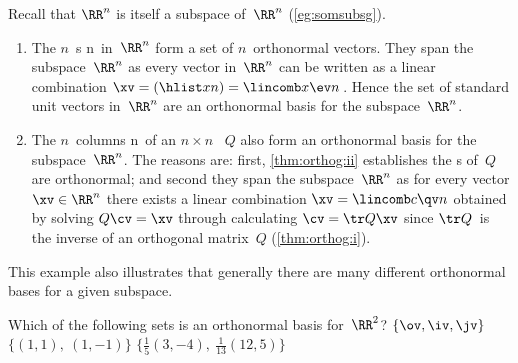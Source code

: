 \begin{example} 
Recall that \(\RR^n\) is itself a subspace of~\(\RR^n\) (\cref{eg:somsubsg}).
\begin{enumerate}
\item The \(n\)~s \hlist\ev n\ in~\(\RR^n\) form a set of \(n\)~orthonormal vectors.
They span the subspace~\(\RR^n\) as every vector in~\(\RR^n\) can be written as a linear combination \(\xv=(\hlist xn)=\lincomb x\ev n\)\,.
Hence the set of standard unit vectors in~\(\RR^n\) are an orthonormal basis for the subspace~\(\RR^n\).

\item The \(n\)~columns \hlist\qv n\ of an \(n\times n\) ~\(Q\) also form an orthonormal basis for the subspace~\(\RR^n\).
The reasons are: first, \cref{thm:orthog:ii} establishes the s of~\(Q\) are orthonormal; and second they span the subspace~\(\RR^n\) as for every vector \(\xv\in\RR^n\) there exists a linear combination \(\xv=\lincomb c\qv n\) obtained by solving \(Q\cv=\xv\) through calculating \(\cv=\tr Q\xv\) since \(\tr Q\)~is the inverse of an orthogonal matrix~\(Q\) (\cref{thm:orthog:i}).
\end{enumerate}
This example also illustrates that generally there are many different orthonormal bases for a given subspace.
\end{example}



\begin{activity}
Which of the following sets is an orthonormal basis for~\(\RR^2\)?
{\(\{\ov,\iv,\jv\}\)}
{\(\{(1,1),\ (1,-1)\}\)}
{\(\{\frac15(3,-4),\ \frac1{13}(12,5)\}\)}
\end{activity}



